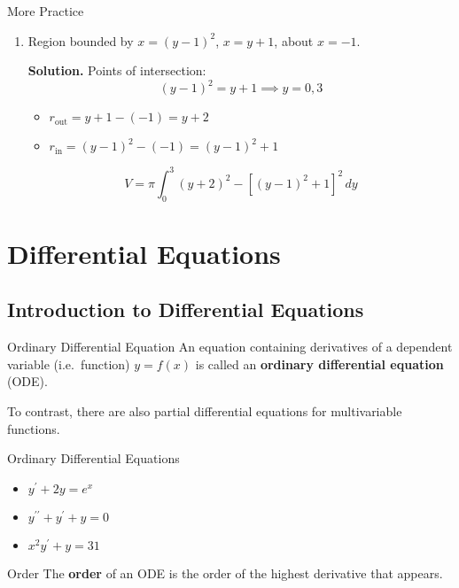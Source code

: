 \begin{Example}{More Practice}{}
\begin{enumerate}[label=(\roman*)]
        \item Region bounded by $ x=(y-1)^2 $, $ x=y+1 $, about $ x=-1 $.

              \textbf{Solution.} Points of intersection:
              \[ (y-1)^2=y+1\implies y=0,3 \]
              \begin{itemize}
                  \item $ r_{\text{out}}=y+1-(-1)=y+2 $
                  \item $ r_{\text{in}}=(y-1)^2-(-1)=(y-1)^2+1 $
              \end{itemize}
              \[ V=\pi \int_{0}^{3} (y+2)^2-\left[ (y-1)^2+1 \right]^2\, d{y}  \]
    \end{enumerate}
\end{Example}

\chapter{Differential Equations}
\section{Introduction to Differential Equations}
\begin{Definition}{Ordinary Differential Equation}{}
    An equation containing derivatives of a dependent variable (i.e.\ function) $ y=f(x) $
    is called an \textbf{ordinary differential equation} (ODE).
\end{Definition}

\begin{Remark}{}{}
    To contrast, there are also partial differential equations for multivariable functions.
\end{Remark}

\begin{Example}{Ordinary Differential Equations}{}
    \begin{itemize}
        \item $ y^\prime+2y=e^x $
        \item $ y^{\prime\prime}+y^\prime+y=0 $
        \item $ x^2y^\prime+y=31 $
    \end{itemize}
\end{Example}

\begin{Definition}{Order}{}
    The \textbf{order} of an ODE is the order of the highest derivative that appears.
\end{Definition}

